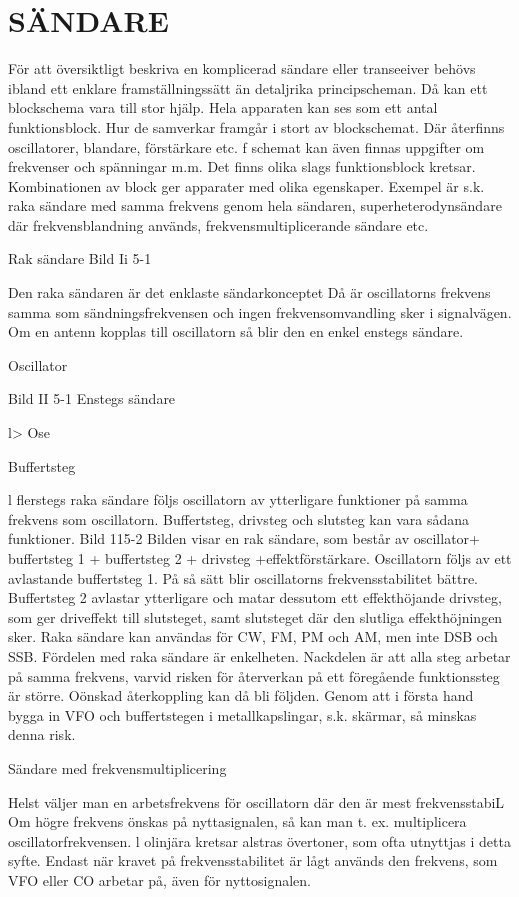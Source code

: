 \chapter{SÄNDARE}

För att översiktligt beskriva en komplicerad
sändare eller transeeiver behövs ibland ett
enklare framställningssätt än detaljrika
principscheman. Då kan ett blockschema
vara till stor hjälp.
Hela apparaten kan ses som ett antal
funktionsblock. Hur de samverkar framgår i
stort av blockschemat. Där återfinns oscillatorer, blandare, förstärkare etc. f schemat
kan även finnas uppgifter om frekvenser
och spänningar m.m.
Det finns olika slags funktionsblock kretsar. Kombinationen av block ger apparater med olika egenskaper. Exempel är
s.k. raka sändare med samma frekvens
genom hela sändaren, superheterodynsändare där frekvensblandning används,
frekvensmultiplicerande sändare etc.

Rak sändare
Bild Ii 5-1

Den raka sändaren är det enklaste sändarkonceptet Då är oscillatorns frekvens samma som sändningsfrekvensen och ingen
frekvensomvandling sker i signalvägen. Om
en antenn kopplas till oscillatorn så blir den
en enkel enstegs sändare.

Oscillator

Bild II 5-1 Enstegs sändare

l>
Ose

Buffertsteg

l flerstegs raka sändare följs oscillatorn
av ytterligare funktioner på samma frekvens
som oscillatorn. Buffertsteg, drivsteg och
slutsteg kan vara sådana funktioner.
Bild 115-2
Bilden visar en rak sändare, som består
av oscillator+ buffertsteg 1 + buffertsteg 2 +
drivsteg +effektförstärkare.
Oscillatorn följs av ett avlastande buffertsteg 1. På så sätt blir oscillatorns frekvensstabilitet bättre. Buffertsteg 2 avlastar
ytterligare och matar dessutom ett effekthöjande drivsteg, som ger driveffekt till
slutsteget, samt slutsteget där den slutliga
effekthöjningen sker.
Raka sändare kan användas för CW,
FM, PM och AM, men inte DSB och SSB.
Fördelen med raka sändare är enkelheten.
Nackdelen är att alla steg arbetar på samma
frekvens, varvid risken för återverkan på ett
föregående funktionssteg är större. Oönskad återkoppling kan då bli följden. Genom
att i första hand bygga in VFO och buffertstegen i metallkapslingar, s.k. skärmar, så
minskas denna risk.

Sändare med frekvensmultiplicering

Helst väljer man en arbetsfrekvens för oscillatorn där den är mest frekvensstabiL
Om högre frekvens önskas på nyttasignalen, så kan man t. ex. multiplicera
oscillatorfrekvensen. l olinjära kretsar alstras övertoner, som ofta utnyttjas i detta
syfte.
Endast när kravet på frekvensstabilitet är
lågt används den frekvens, som VFO eller
CO arbetar på, även för nyttosignalen.

